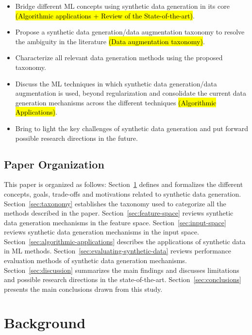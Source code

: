 \documentclass[parskip=full]{scrartcl}
\begin{document}
\begin{itemize}
    \item Bridge different ML concepts using synthetic data generation in its
        core \hl{(Algorithmic applications + Review of the State-of-the-art)}.
    \item Propose a synthetic data generation/data augmentation taxonomy to
        resolve the ambiguity in the literature \hl{(Data augmentation
        taxonomy)}.
    \item Characterize all relevant data generation methods using the proposed
        taxonomy. 
    \item Discuss the ML techniques in which synthetic data generation/data
        augmentation is used, beyond regularization and consolidate the
        current data generation mechanisms across the different techniques
        \hl{(Algorithmic Applications)}.
    \item Bring to light the key challenges of synthetic data generation and
        put forward possible research directions in the future.
\end{itemize}


\subsection{Paper Organization}

This paper is organized as follows: Section~\ref{sec:background} defines and
formalizes the different concepts, goals, trade-offs and motivations related
to synthetic data generation. Section~\ref{sec:taxonomy} establishes the
taxonomy used to categorize all the methods described in the paper.
Section~\ref{sec:feature-space} reviews synthetic data generation
mechanisms in the feature space. Section~\ref{sec:input-space}
reviews synthetic data generation mechanisms in the input space.
Section~\ref{sec:algorithmic-applications} describes the applications of
synthetic data in ML methods. Section~\ref{sec:evaluating-synthetic-data}
reviews performance evaluation methods of synthetic data generation
mechanisms. Section~\ref{sec:discussion} summarizes the main findings and
discusses limitations and possible research directions in the
state-of-the-art. Section~\ref{sec:conclusions} presents the main conclusions
drawn from this study.

\section{Background}\label{sec:background}
\end{document}
